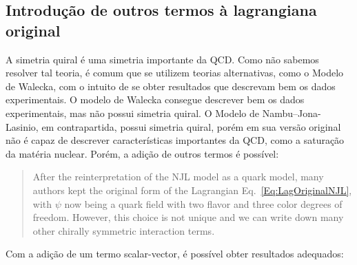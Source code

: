 \subsection{Introdução de outros termos à lagrangiana original}
\label{Sec:Introducao_termos_lag_NJL}

A simetria quiral é uma simetria importante da QCD\cite{Koch}. Como não sabemos resolver tal teoria, é comum que se utilizem teorias alternativas, como o Modelo de Walecka, com o intuito de se obter resultados que descrevam bem os dados experimentais. O modelo de Walecka consegue descrever bem os dados experimentais, mas não possui simetria quiral. O Modelo de Nambu--Jona-Lasinio, em contrapartida, possui simetria quiral, porém em sua versão original não é capaz de descrever características importantes da QCD, como a saturação da matéria nuclear. Porém, a adição de outros termos é possível:\cite{Buballa}
\begin{quote}
After the reinterpretation of the NJL model as a quark model, many authors kept the original form of the Lagrangian Eq.~\eqref{Eq:LagOriginalNJL}, with $\psi$ now being a quark field with two flavor and three color degrees of freedom. However, this choice is not unique and we can write down many other chirally symmetric interaction terms.
\end{quote}
%
Com a adição de um termo scalar-vector, é possível obter resultados adequados\cite{Koch}:
